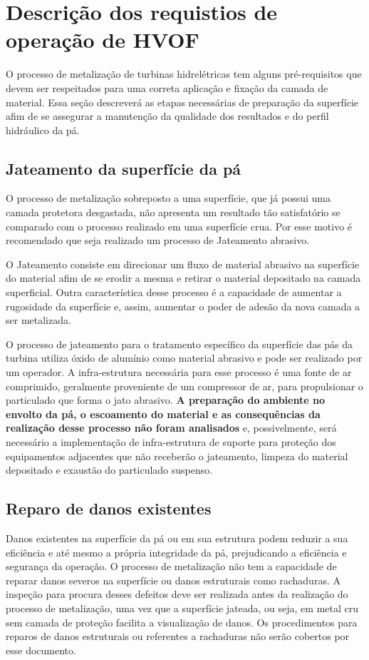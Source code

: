 \section{Descrição dos requistios de operação de HVOF}

O processo de metalização de turbinas hidrelétricas tem alguns pré-requisitos
que devem ser respeitados para uma correta aplicação e fixação da camada de
material. Essa seção descreverá as etapas necessárias de preparação da
superfície afim de se assegurar a manutenção da qualidade dos resultados e do
perfil hidráulico da pá. 

\subsection{Jateamento da superfície da pá}

O processo de metalização sobreposto a uma superfície, que já possui uma camada
protetora desgastada, não apresenta um resultado tão satisfatório se comparado
com o processo realizado em uma superfície crua. Por esse motivo é recomendado
que seja realizado um processo de Jateamento abrasivo. 

O Jateamento consiste em direcionar um fluxo de material abrasivo na superfície
do material afim de se erodir a mesma e retirar o material depositado na camada
superficial. Outra característica desse processo é a capacidade de aumentar a
rugosidade da superfície e, assim, aumentar o poder de adesão da nova camada a
ser metalizada.

O processo de jateamento para o tratamento específico da superfície das pás da
turbina utiliza óxido de alumínio como material abrasivo e pode ser realizado
por um operador. A infra-estrutura necessária para esse processo é uma fonte de
ar comprimido, geralmente proveniente de um compressor de ar, para propulsionar
o particulado que forma o jato abrasivo. \textbf{A preparação do ambiente no envolto da pá, 
o escoamento do material e
as consequências da realização desse processo não foram analisados} e,
possivelmente, será necessário a implementação de infra-estrutura de suporte
para proteção dos equipamentos adjacentes que não receberão o jateamento,
limpeza do material depositado e exaustão do particulado suspenso.

\subsection{Reparo de danos existentes}

Danos existentes na superfície da pá ou em sua estrutura podem reduzir a sua
eficiência e até mesmo a própria integridade da pá, prejudicando a eficiência e
segurança da operação. O processo de metalização não tem a capacidade de reparar
danos severos na superfície ou danos estruturais como rachaduras. A inspeção
para procura desses defeitos deve ser realizada antes da realização do processo
de metalização, uma vez que a superfície jateada, ou seja, em metal cru sem
camada de proteção facilita a visualização de danos. Os procedimentos para
reparos de danos estruturais ou referentes a rachaduras não serão cobertos por
esse documento.

